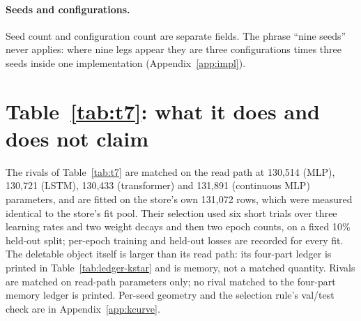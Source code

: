 \documentclass{article} %
\begin{document}
\paragraph{Seeds and configurations.} Seed count and configuration count are separate fields. The
phrase ``nine seeds'' never applies: where nine legs appear they are three configurations times
three seeds inside one implementation (Appendix~\ref{app:impl}).

\section{Table~\ref{tab:t7}: what it does and does not claim}
\label{app:t7more}
The rivals of Table~\ref{tab:t7} are matched on the read path at 130,514 (MLP), 130,721 (LSTM), %
130,433 (transformer) and 131,891 (continuous MLP) parameters, and are fitted on the store's own %
131,072 rows, which were measured identical to the store's fit pool. Their selection used six short %
trials over three learning rates and two weight decays and then two epoch counts, on a fixed 10\%
held-out split; per-epoch training and held-out losses are recorded for every fit. %
The deletable object itself is larger than its read path: its four-part ledger is printed in
Table~\ref{tab:ledger-kstar} and is memory, not a matched quantity. Rivals are matched on read-path
parameters only; no rival matched to the four-part memory ledger is printed.
Per-seed geometry and the selection rule's val/test check are in Appendix~\ref{app:kcurve}.
\end{document}
